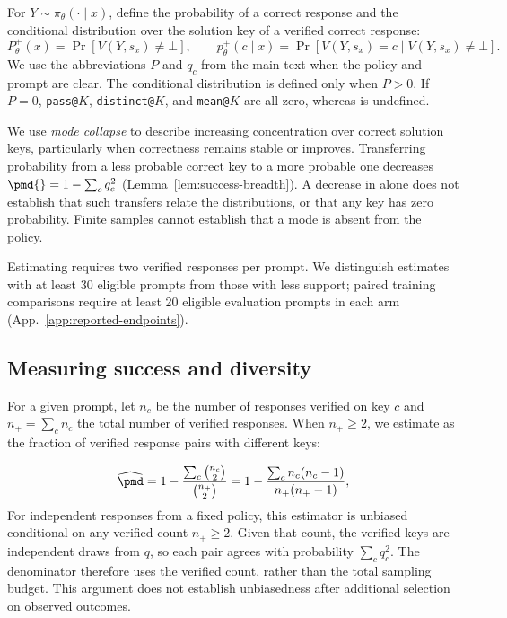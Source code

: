 For $Y\sim\pi_\theta(\cdot\mid x)$, define the probability of a correct
response and the conditional distribution over the solution key of a verified
correct response:
\[
 P_\theta^+(x)=\Pr[V(Y,s_x)\neq\bot],
 \qquad
 p_\theta^+(c\mid x)=\Pr[V(Y,s_x)=c\mid V(Y,s_x)\neq\bot].
\]
We use the abbreviations $P$ and $q_c$ from the main text when the policy
and prompt are clear. The conditional distribution is defined only when
$P>0$. If $P=0$, \texttt{pass@}$K$, \texttt{distinct@}$K$, and
\texttt{mean@}$K$ are all zero, whereas \pmd{} is undefined.

We use \emph{mode collapse} to describe increasing concentration over correct
solution keys, particularly when correctness remains stable or improves.
Transferring probability from a less probable correct key to a more probable
one decreases $\pmd{}=1-\sum_c q_c^2$ (Lemma~\ref{lem:success-breadth}).
A decrease in \pmd{} alone does not establish that such transfers relate the
distributions, or that any key has zero probability. Finite samples cannot
establish that a mode is absent from the policy.

Estimating \pmd{} requires two verified responses per prompt. We distinguish
estimates with at least 30 eligible prompts from those with less support;
paired training comparisons require at least 20 eligible evaluation prompts in each arm
(App.~\ref{app:reported-endpoints}).

\subsection{Measuring success and diversity}
\label{app:metric-sampling}

For a given prompt, let $n_c$ be the number of responses verified on key $c$
and $n_+=\sum_c n_c$ the total number of verified responses. When
$n_+\ge2$, we estimate \pmd{} as the fraction of verified response pairs
with different keys:

\begin{equation}
 \widehat{\pmd}
 =1-\frac{\sum_c \binom{n_c}{2}}{\binom{n_+}{2}}
 =1-\frac{\sum_c n_c(n_c-1)}{n_+(n_+-1)},
 \label{eq:main-pmd-estimator}
\end{equation}
For independent responses from a fixed policy, this estimator is unbiased
conditional on any verified count $n_+\ge2$. Given that count, the verified
keys are independent draws from $q$, so each pair agrees with probability
$\sum_c q_c^2$. The denominator therefore uses the verified count, rather
than the total sampling budget. This argument does not establish unbiasedness
after additional selection on observed outcomes.

